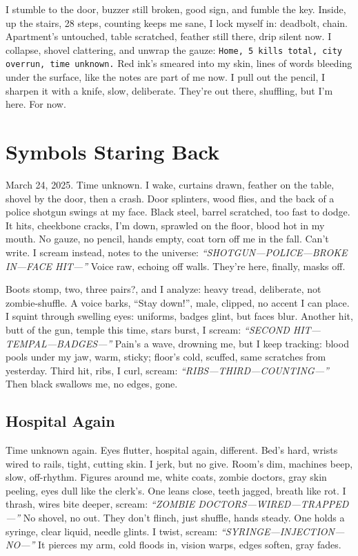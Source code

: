 \documentclass[12pt]{article}
\newcommand{\note}[1]{\texttt{#1}}
\begin{document}
I stumble to the door, buzzer still broken, good sign, and fumble the key. Inside, up the stairs, 28 steps, counting keeps me sane, I lock myself in: deadbolt, chain. Apartment’s untouched, table scratched, feather still there, drip silent now. I collapse, shovel clattering, and unwrap the gauze: \note{Home, 5 kills total, city overrun, time unknown.} Red ink’s smeared into my skin, lines of words bleeding under the surface, like the notes are part of me now. I pull out the pencil, I sharpen it with a knife, slow, deliberate. They’re out there, shuffling, but I’m here. For now.

\section{Symbols Staring Back}

March 24, 2025. Time unknown. I wake, curtains drawn, feather on the table, shovel by the door, then a crash. Door splinters, wood flies, and the back of a police shotgun swings at my face. Black steel, barrel scratched, too fast to dodge. It hits, cheekbone cracks, I’m down, sprawled on the floor, blood hot in my mouth. No gauze, no pencil, hands empty, coat torn off me in the fall. Can’t write. I scream instead, notes to the universe: \textit{“SHOTGUN—POLICE—BROKE IN—FACE HIT—”} Voice raw, echoing off walls. They’re here, finally, masks off.

Boots stomp, two, three pairs?, and I analyze: heavy tread, deliberate, not zombie-shuffle. A voice barks, “Stay down!”, male, clipped, no accent I can place. I squint through swelling eyes: uniforms, badges glint, but faces blur. Another hit, butt of the gun, temple this time, stars burst, I scream: \textit{“SECOND HIT—TEMPAL—BADGES—”} Pain’s a wave, drowning me, but I keep tracking: blood pools under my jaw, warm, sticky; floor’s cold, scuffed, same scratches from yesterday. Third hit, ribs, I curl, scream: \textit{“RIBS—THIRD—COUNTING—”} Then black swallows me, no edges, gone.

\subsection*{Hospital Again}

Time unknown again. Eyes flutter, hospital again, different. Bed’s hard, wrists wired to rails, tight, cutting skin. I jerk, but no give. Room’s dim, machines beep, slow, off-rhythm. Figures around me, white coats, zombie doctors, gray skin peeling, eyes dull like the clerk’s. One leans close, teeth jagged, breath like rot. I thrash, wires bite deeper, scream: \textit{“ZOMBIE DOCTORS—WIRED—TRAPPED—”} No shovel, no out. They don’t flinch, just shuffle, hands steady. One holds a syringe, clear liquid, needle glints. I twist, scream: \textit{“SYRINGE—INJECTION—NO—”} It pierces my arm, cold floods in, vision warps, edges soften, gray fades.
\end{document}
